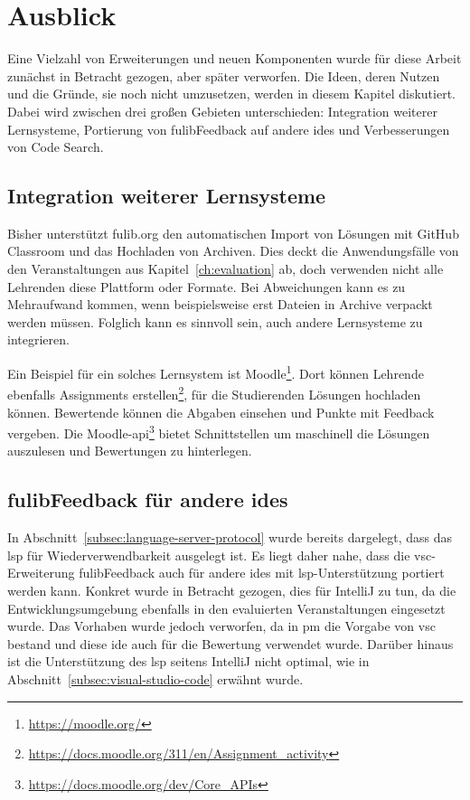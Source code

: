 \chapter{Ausblick}\label{ch:future-work}

Eine Vielzahl von Erweiterungen und neuen Komponenten wurde für diese Arbeit zunächst in Betracht gezogen, aber später verworfen.
Die Ideen, deren Nutzen und die Gründe, sie noch nicht umzusetzen, werden in diesem Kapitel diskutiert.
Dabei wird zwischen drei großen Gebieten unterschieden:
Integration weiterer Lernsysteme, Portierung von fulibFeedback auf andere \acp{ide} und Verbesserungen von Code Search.

\section{Integration weiterer Lernsysteme}

Bisher unterstützt fulib.org den automatischen Import von Lösungen mit GitHub Classroom und das Hochladen von Archiven.
Dies deckt die Anwendungsfälle von den Veranstaltungen aus Kapitel~\ref{ch:evaluation} ab, doch verwenden nicht alle Lehrenden diese Plattform oder Formate.
Bei Abweichungen kann es zu Mehraufwand kommen, wenn beispielsweise erst Dateien in Archive verpackt werden müssen.
Folglich kann es sinnvoll sein, auch andere Lernsysteme zu integrieren.

Ein Beispiel für ein solches Lernsystem ist Moodle\footnote{\url{https://moodle.org/}}.
Dort können Lehrende ebenfalls Assignments erstellen\footnote{\url{https://docs.moodle.org/311/en/Assignment_activity}}, für die Studierenden Lösungen hochladen können.
Bewertende können die Abgaben einsehen und Punkte mit Feedback vergeben.
Die Moodle-\ac{api}\footnote{\url{https://docs.moodle.org/dev/Core_APIs}} bietet Schnittstellen um maschinell die Lösungen auszulesen und Bewertungen zu hinterlegen.

\section{fulibFeedback für andere \acsp{ide}}\label{sec:other-ides}

In Abschnitt~\ref{subsec:language-server-protocol} wurde bereits dargelegt, dass das \ac{lsp} für Wiederverwendbarkeit ausgelegt ist.
Es liegt daher nahe, dass die \ac{vsc}-Erweiterung fulibFeedback auch für andere \acp{ide} mit \ac{lsp}-Unterstützung portiert werden kann.
Konkret wurde in Betracht gezogen, dies für IntelliJ zu tun, da die Entwicklungsumgebung ebenfalls in den evaluierten Veranstaltungen eingesetzt wurde.
Das Vorhaben wurde jedoch verworfen, da in \ac{pm} die Vorgabe von \ac{vsc} bestand und diese \ac{ide} auch für die Bewertung verwendet wurde.
Darüber hinaus ist die Unterstützung des \ac{lsp} seitens IntelliJ nicht optimal, wie in Abschnitt~\ref{subsec:visual-studio-code} erwähnt wurde.

